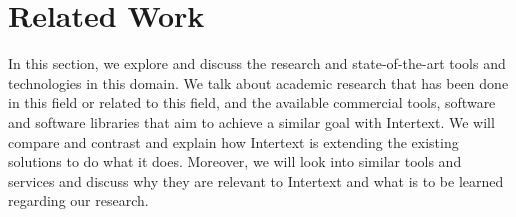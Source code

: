 
\chapter{Related Work} \label{relatedWork}

In this section, we explore and discuss the research and state-of-the-art tools and technologies in this domain. We talk about academic research that has been done in this field or related to this field, and the available commercial tools, software and software libraries that aim to achieve a similar goal with Intertext.  We will compare and contrast and explain how Intertext is extending the existing solutions to do what it does. Moreover, we will look into similar tools and services and discuss why they are relevant to Intertext and what is to be learned regarding our research.









